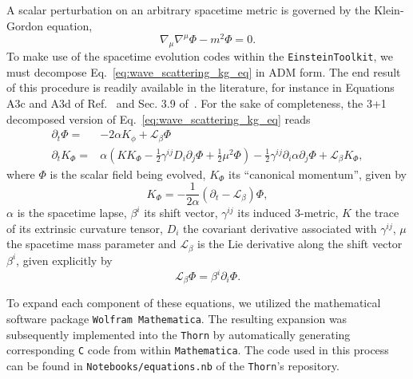A scalar perturbation on an arbitrary spacetime metric is governed by the Klein-Gordon equation,
%
\begin{equation}
  \nabla_\mu \nabla^\mu \Phi - m^2 \Phi = 0.
  \label{eq:wave_scattering_kg_eq}
\end{equation}
%
To make use of the spacetime evolution codes within the \texttt{EinsteinToolkit}, we must decompose Eq.~\eqref{eq:wave_scattering_kg_eq} in ADM form. The end result of this procedure is readily available in the literature, for instance in Equations A3c and A3d of Ref.~\cite{PhysRevD.96.104040} and Sec. 3.9 of~\cite{Ficarra2023}. For the sake of completeness, the 3+1 decomposed version of Eq.~\eqref{eq:wave_scattering_kg_eq} reads
%
\begin{align}
  \partial_t \Phi =   & -2 \alpha K_\phi + \mathcal{L}_\beta \Phi \label{eq:wave_scattering_a3c}                                                                                                                                                     \\
  \partial_t K_\Phi = & \alpha \left( K K_\Phi - \frac{1}{2} \gamma^{ij} D_i \partial_j \Phi + \frac{1}{2} \mu^2 \Phi \right) - \frac{1}{2} \gamma^{ij} \partial_i \alpha \partial_j \Phi + \mathcal{L}_\beta K_\Phi, \label{eq:wave_scattering_a3d}
\end{align}
%
where $\Phi$ is the scalar field being evolved, $K_\Phi$ its ``canonical momentum'', given by
%
\begin{equation}
  K_\Phi = -\frac{1}{2\alpha} \left( \partial_t - \mathcal{L}_\beta \right)\Phi,
  \label{eq:wave_scattering_a2}
\end{equation}
%
$\alpha$ is the spacetime lapse, $\beta^i$ its shift vector, $\gamma^{ij}$ its induced 3-metric, $K$ the trace of its extrinsic curvature tensor, $D_i$ the covariant derivative associated with $\gamma^{ij}$, $\mu$ the spacetime mass parameter and $\mathcal{L}_\beta$ is the Lie derivative along the shift vector $\beta^i$, given explicitly by
%
\begin{equation}
  \mathcal{L}_\beta\Phi = \beta^i \partial_i \Phi.
  \label{eq:wave_scattering_lie_derivative}
\end{equation}

To expand each component of these equations, we utilized the mathematical software package \texttt{Wolfram Mathematica}. The resulting expansion was subsequently implemented into the \texttt{Thorn} by automatically generating corresponding \texttt{C} code from within \texttt{Mathematica}. The code used in this process can be found in \texttt{Notebooks/equations.nb} of the \texttt{Thorn}'s repository.